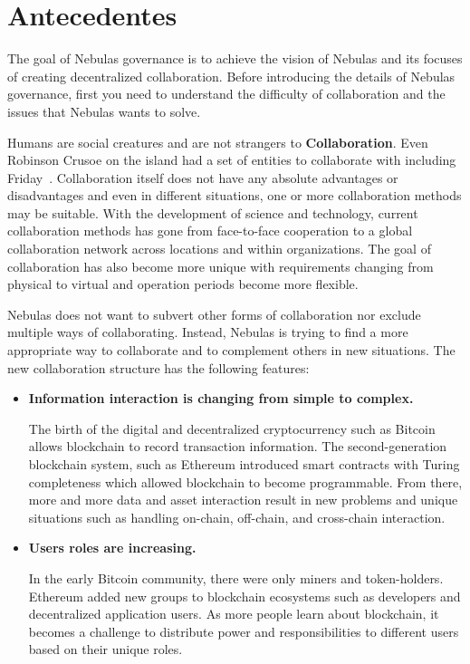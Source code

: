 \section{Antecedentes}

The goal of Nebulas governance is to achieve the vision of Nebulas and its focuses of creating decentralized collaboration. Before introducing the details of Nebulas governance, first you need to understand the difficulty of collaboration and the issues that Nebulas wants to solve.

\label{background}

Humans are social creatures and are not strangers to \textbf{Collaboration}. Even Robinson Crusoe on the island had a set of entities to collaborate with including Friday~\cite{robinson}. Collaboration itself does not have any absolute advantages or disadvantages and even in different situations, one or more collaboration methods may be suitable. With the development of science and technology, current collaboration methods has gone from face-to-face cooperation to a global collaboration network across locations and within organizations. The goal of collaboration has also become more unique with requirements changing from physical to virtual and operation periods become more flexible.

Nebulas does not want to subvert other forms of collaboration nor exclude multiple ways of collaborating. Instead, Nebulas is trying to find a more appropriate way to collaborate and to complement others in new situations. The new collaboration structure has the following features:

\begin{itemize}
	\item \textbf{Information interaction is changing from simple to complex.}

	The birth of the digital and decentralized cryptocurrency such as Bitcoin allows blockchain to record transaction information. The second-generation blockchain system, such as Ethereum introduced smart contracts with Turing completeness which allowed blockchain to become programmable. From there, more and more data and asset interaction result in new problems and unique situations such as handling on-chain, off-chain, and cross-chain interaction.

	\item \textbf{Users roles are increasing.}

	In the early Bitcoin community, there were only miners and token-holders. Ethereum added new groups to blockchain ecosystems such as developers and decentralized application users. As more people learn about blockchain, it becomes a challenge to distribute power and responsibilities to different users based on their unique roles.

\end{itemize}

